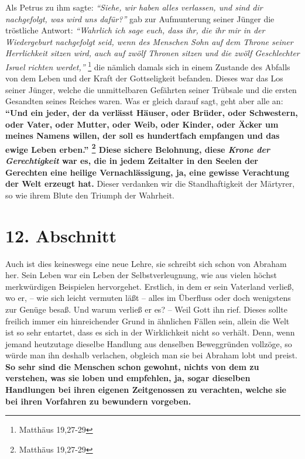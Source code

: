 Als Petrus zu ihm sagte:
\textit{"`Siehe, wir haben alles verlassen, und sind dir
nachgefolgt, was wird uns dafür?"'}
gab zur Aufmunterung seiner Jünger die tröstliche Antwort:
\textit{"`Wahrlich ich sage euch, dass ihr, die ihr mir in der
Wiedergeburt nachgefolgt seid, wenn des Menschen Sohn auf dem Throne seiner
Herrlichkeit sitzen wird, auch auf zwölf Thronen sitzen und die zwölf
Geschlechter Israel richten werdet,"'}
\footnote{Matthäus  19,27-29}
die nämlich
damals sich in einem Zustande des Abfalls von dem Leben und der Kraft der
Gottseligkeit befanden. Dieses war das Los seiner Jünger, welche die
unmittelbaren Gefährten seiner Trübsale und die ersten Gesandten seines
Reiches waren. Was er gleich darauf sagt, geht aber alle an:
\textbf{ "`Und ein
jeder, der da verlässt Häuser, oder Brüder, oder Schwestern, oder Vater, oder
Mutter, oder Weib, oder Kinder, oder Äcker um meines Namens willen, der
soll es hundertfach empfangen und das ewige Leben erben."'
\footnote{Matthäus  19,27-29}
Diese sichere Belohnung, diese
\textit{Krone der Gerechtigkeit} 
war es, die in jedem Zeitalter in den Seelen der Gerechten
eine heilige Vernachlässigung, ja, eine gewisse Verachtung der Welt erzeugt
hat.} Dieser verdanken wir die Standhaftigkeit der Märtyrer, 
so wie ihrem
Blute den Triumph der Wahrheit.
\label{ref:04_10_pilger_ende}

\section{12. Abschnitt} \label{kap4_ab12}

Auch ist dies keineswegs eine neue Lehre, sie schreibt sich schon von
Abraham  her. Sein Leben war ein Leben der
Selbstverleugnung, wie aus vielen
höchst merkwürdigen Beispielen hervorgehet. Erstlich, in dem er sein Vaterland
verließ, wo er, -- wie sich leicht vermuten läßt -- alles im Überfluss oder
doch wenigstens zur Genüge besaß. Und warum verließ er es? -- Weil Gott ihn
rief. Dieses sollte freilich immer ein hinreichender Grund in ähnlichen Fällen
sein, allein die Welt ist so sehr entartet, dass es sich in der Wirklichkeit
nicht so verhält. Denn, wenn jemand heutzutage dieselbe Handlung aus denselben
Beweggründen vollzöge, so würde man ihn deshalb verlachen, obgleich man sie bei
Abraham lobt und preist.
\label{ref:04_12_tugend}
\textbf{So sehr sind die Menschen schon gewohnt, nichts von
dem zu verstehen, was sie loben und empfehlen, ja, sogar dieselben Handlungen
bei ihren eigenen Zeitgenossen zu verachten, welche sie bei ihren Vorfahren zu
bewundern vorgeben.}

